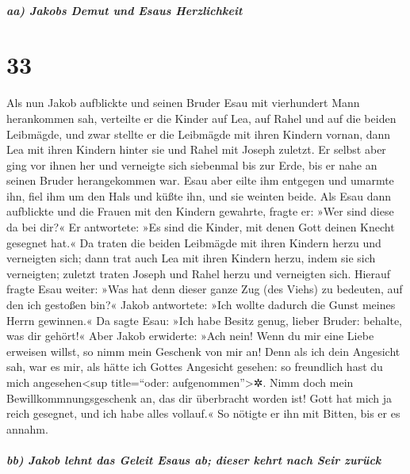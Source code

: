 \hypertarget{aa-jakobs-demut-und-esaus-herzlichkeit}{%
\subparagraph{aa) Jakobs Demut und Esaus
Herzlichkeit}\label{aa-jakobs-demut-und-esaus-herzlichkeit}}

\hypertarget{section-32}{%
\section{33}\label{section-32}}

 Als nun Jakob aufblickte und seinen Bruder Esau mit
vierhundert Mann herankommen sah, verteilte er die Kinder auf Lea, auf
Rahel und auf die beiden Leibmägde,  und zwar stellte er
die Leibmägde mit ihren Kindern vornan, dann Lea mit ihren Kindern
hinter sie und Rahel mit Joseph zuletzt.  Er selbst aber
ging vor ihnen her und verneigte sich siebenmal bis zur Erde, bis er
nahe an seinen Bruder herangekommen war.  Esau aber eilte
ihm entgegen und umarmte ihn, fiel ihm um den Hals und küßte ihn, und
sie weinten beide.  Als Esau dann aufblickte und die
Frauen mit den Kindern gewahrte, fragte er: »Wer sind diese da bei dir?«
Er antwortete: »Es sind die Kinder, mit denen Gott deinen Knecht
gesegnet hat.«  Da traten die beiden Leibmägde mit ihren
Kindern herzu und verneigten sich;  dann trat auch Lea mit
ihren Kindern herzu, indem sie sich verneigten; zuletzt traten Joseph
und Rahel herzu und verneigten sich.  Hierauf fragte Esau
weiter: »Was hat denn dieser ganze Zug (des Viehs) zu bedeuten, auf den
ich gestoßen bin?« Jakob antwortete: »Ich wollte dadurch die Gunst
meines Herrn gewinnen.«  Da sagte Esau: »Ich habe Besitz
genug, lieber Bruder: behalte, was dir gehört!«  Aber
Jakob erwiderte: »Ach nein! Wenn du mir eine Liebe erweisen willst, so
nimm mein Geschenk von mir an! Denn als ich dein Angesicht sah, war es
mir, als hätte ich Gottes Angesicht gesehen: so freundlich hast du mich
angesehen\textless sup title=``oder: aufgenommen''\textgreater✲.
 Nimm doch mein Bewillkommnungsgeschenk an, das dir
überbracht worden ist! Gott hat mich ja reich gesegnet, und ich habe
alles vollauf.« So nötigte er ihn mit Bitten, bis er es annahm.

\hypertarget{bb-jakob-lehnt-das-geleit-esaus-ab-dieser-kehrt-nach-seir-zuruxfcck}{%
\subparagraph{bb) Jakob lehnt das Geleit Esaus ab; dieser kehrt nach
Seir
zurück}\label{bb-jakob-lehnt-das-geleit-esaus-ab-dieser-kehrt-nach-seir-zuruxfcck}}

